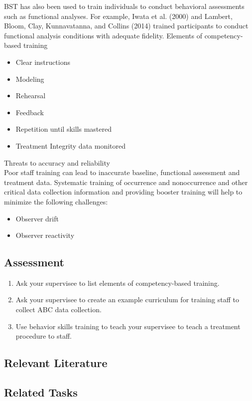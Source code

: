 BST has also been used to train individuals to conduct behavioral assessments such as functional analyses. For example, Iwata et al. (2000) and Lambert, Bloom, Clay, Kunnavatanna, and Collins (2014) trained participants to conduct functional analysis conditions with adequate fidelity. 
%
Elements of competency-based training
\begin{itemize}
\item Clear instructions
\item Modeling
\item Rehearsal
\item Feedback 
\item Repetition until skills mastered
\item Treatment Integrity data monitored
\end{itemize}
%
Threats to accuracy and reliability\\
Poor staff training can lead to inaccurate baseline, functional assessment and treatment data.  Systematic training of occurrence and nonoccurrence and other critical data collection information and providing booster training will help to minimize the following challenges:
\begin{itemize}
\item Observer drift
\item Observer reactivity
\end{itemize}
%
\subsection{Assessment}
\begin{enumerate}
\item Ask your supervisee to list elements of competency-based training. 
\item Ask your supervisee to create an example curriculum for training staff to collect ABC data collection.
\item Use behavior skills training to teach your supervisee to teach a treatment procedure to staff. 
%
\end{enumerate}
%
\subsection{Relevant Literature}
\begin{refsection}
\nocite{cooper2007applied,
        iwata2000skill,
        lambert2014training,
        miles2009effects,
        parsons1995training,
        sarokoff2004effects,
        shore1995pyramidal}
\printbibliography[heading=none]
\end{refsection} 
%
\subsection{Related Tasks}
\fourdFour{}\\
\fourdFive{}\\
\foureThree{}\\
\fourfThree{}\\
\fourkTwo{}\\
